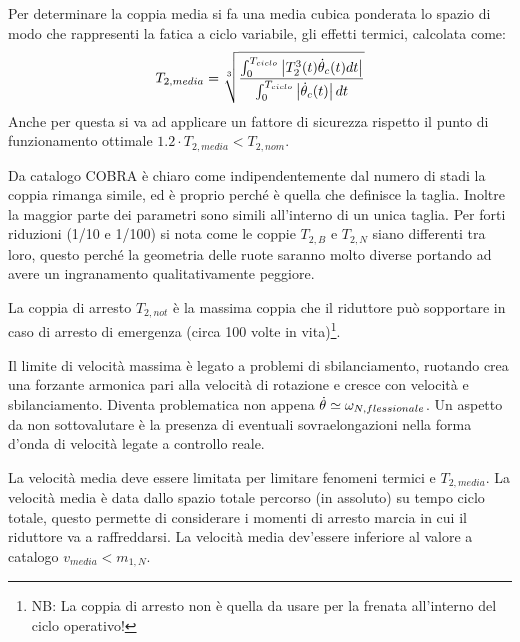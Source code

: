 Per determinare la coppia media si fa una media cubica ponderata lo spazio di modo che rappresenti la fatica a ciclo variabile, gli effetti termici, calcolata come:
\[
T_{2,media} = \sqrt[3]{\frac{\int^{T_{ciclo}}_0 \left|T_2^3(t)\dot{\theta}_c(t)dt\right|}{\int^{T_{ciclo}}_0 \left|\dot{\theta}_c(t)\right|dt}}
\]
Anche per questa si va ad applicare un fattore di sicurezza rispetto il punto di funzionamento ottimale $1.2\cdot T_{2,media}<T_{2,nom}$.

Da catalogo COBRA è chiaro come indipendentemente dal numero di stadi la coppia rimanga simile, ed è proprio perché è quella che definisce la taglia. 
Inoltre la maggior parte dei parametri sono simili all'interno di un unica taglia.
Per forti riduzioni (1/10 e 1/100) si nota come le coppie $T_{2,B}$ e $T_{2,N}$ siano differenti tra loro, questo perché la geometria delle ruote saranno molto diverse portando ad avere un ingranamento qualitativamente peggiore.

La coppia di arresto $T_{2,not}$ è la massima coppia che il riduttore può sopportare in caso di arresto di emergenza (circa 100 volte in vita)\footnote{NB: La coppia di arresto non è quella da usare per la frenata all'interno del ciclo operativo!}.

Il limite di velocità massima è legato a problemi di sbilanciamento, ruotando crea una forzante armonica pari alla velocità di rotazione e cresce con velocità e sbilanciamento. Diventa problematica non appena $\dot{\theta} \simeq \omega_{N, flessionale}$.
Un aspetto da non sottovalutare è la presenza di eventuali sovraelongazioni nella forma d'onda di velocità legate a controllo reale.

La velocità media deve essere limitata per limitare fenomeni termici e $T_{2,media}$. La velocità media è data dallo spazio totale percorso (in assoluto) su tempo ciclo totale, questo permette di considerare i momenti di arresto marcia in cui il riduttore va a raffreddarsi. La velocità media dev'essere inferiore al valore a catalogo $v_{media} < m_{1,N}$.